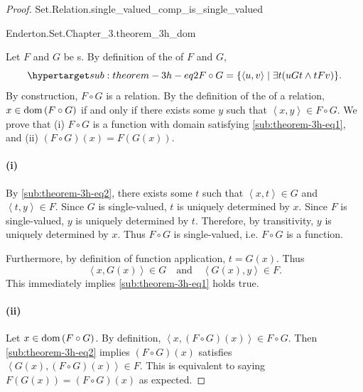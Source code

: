 \documentclass{report}
\newcommand{\pair}[1]{\left< #1 \right>}
\begin{document}
\begin{proof}

  \statementpadding

    {Set.Relation.single\_valued\_comp\_is\_single\_valued}

    {Enderton.Set.Chapter\_3.theorem\_3h\_dom}

  Let $F$ and $G$ be s.
  By definition of the  of $F$ and $G$,
    \begin{equation}
      \hyperlabel{sub:theorem-3h-eq2}
      F \circ G = \{\pair{u, v} \mid \exists t(uGt \land tFv)\}.
    \end{equation}
  By construction, $F \circ G$ is a relation.
  By the definition of the  of a relation,
    $x \in \mathop{\text{dom}}{(F \circ G)}$ if and only if there exists some $y$ such that
    $\pair{x, y} \in F \circ G$.
  We prove that (i) $F \circ G$ is a function with domain satisfying
    \eqref{sub:theorem-3h-eq1}, and (ii) $(F \circ G)(x) = F(G(x))$.

  \paragraph{(i)}%

    By \eqref{sub:theorem-3h-eq2}, there exists some $t$ such that
      $\pair{x, t} \in G$ and $\pair{t, y} \in F$.
    Since $G$ is single-valued, $t$ is uniquely determined by $x$.
    Since $F$ is single-valued, $y$ is uniquely determined by $t$.
    Therefore, by transitivity, $y$ is uniquely determined by $x$.
    Thus $F \circ G$ is single-valued, i.e. $F \circ G$ is a function.

    Furthermore, by definition of function application, $t = G(x)$.
    Thus $$\pair{x, G(x)} \in G \quad\text{and}\quad \pair{G(x), y} \in F.$$
    This immediately implies \eqref{sub:theorem-3h-eq1} holds true.

  \paragraph{(ii)}%

    Let $x \in \mathop{\text{dom}}{(F \circ G)}$.
    By definition, $\pair{x, (F \circ G)(x)} \in F \circ G$.
    Then \eqref{sub:theorem-3h-eq2} implies $(F \circ G)(x)$ satisfies
      $\pair{G(x), (F \circ G)(x)} \in F$.
    This is equivalent to saying $F(G(x)) = (F \circ G)(x)$ as expected.

\end{proof}
\end{document}

